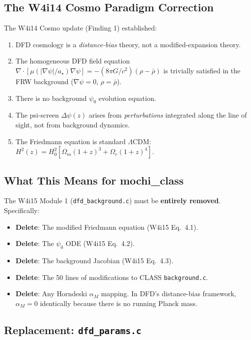 \documentclass[11pt]{article}
\theoremstyle{definition}
\theoremstyle{remark}
\newcommand{\astar}{a_\star}
\newcommand{\LCDM}{$\Lambda$CDM}
\newcommand{\Dpsi}{\Delta\psi}
\begin{document}
\subsection{The W4i14 Cosmo Paradigm Correction}

The W4i14 Cosmo update (Finding 1) established:

\begin{enumerate}
\item DFD cosmology is a \emph{distance-bias} theory, not a
  modified-expansion theory.
\item The homogeneous DFD field equation
  $\nabla \cdot [\mu(|\nabla\psi|/\astar)\nabla\psi]
  = -(8\pi G/c^2)(\rho - \bar\rho)$
  is trivially satisfied in the FRW background ($\nabla\psi = 0$,
  $\rho = \bar\rho$).
\item There is no background $\psi_0$ evolution equation.
\item The psi-screen $\Dpsi(z)$ arises from \emph{perturbations}
  integrated along the line of sight, not from background dynamics.
\item The Friedmann equation is standard \LCDM:
  $H^2(z) = H_0^2[\Omega_m(1+z)^3 + \Omega_r(1+z)^4]$.
\end{enumerate}

\subsection{What This Means for mochi\_class}

The W4i15 Module 1 (\texttt{dfd\_background.c}) must be \textbf{entirely
removed}. Specifically:

\begin{itemize}
\item \textbf{Delete}: The modified Friedmann equation (W4i15 Eq.~4.1).
\item \textbf{Delete}: The $\psi_0$ ODE (W4i15 Eq.~4.2).
\item \textbf{Delete}: The background Jacobian (W4i15 Eq.~4.3).
\item \textbf{Delete}: The 50 lines of modifications to CLASS
  \texttt{background.c}.
\item \textbf{Delete}: Any Horndeski $\alpha_M$ mapping. In DFD's
  distance-bias framework, $\alpha_M = 0$ identically because there
  is no running Planck mass.
\end{itemize}

\subsection{Replacement: \texttt{dfd\_params.c}}
\end{document}
